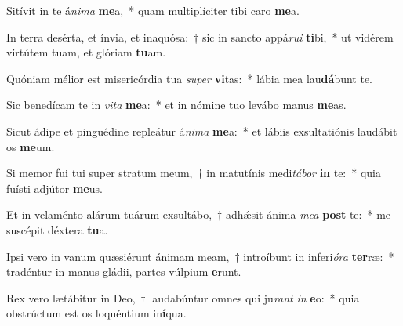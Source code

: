 \item Sitívit in te á\textit{ni}\textit{ma} \textbf{me}a,~* quam multiplíciter tibi caro \textbf{me}a.
\item In terra desérta, et ínvia, et inaquósa:~† sic in sancto appá\textit{ru}\textit{i} \textbf{ti}bi,~* ut vidérem virtútem tuam, et glóriam \textbf{tu}am.
\item Quóniam mélior est misericórdia tua \textit{su}\textit{per} \textbf{vi}tas:~* lábia mea lau\textbf{dá}bunt te.
\item Sic benedícam te in \textit{vi}\textit{ta} \textbf{me}a:~* et in nómine tuo levábo manus \textbf{me}as.
\item Sicut ádipe et pinguédine repleátur á\textit{ni}\textit{ma} \textbf{me}a:~* et lábiis exsultatiónis laudábit os \textbf{me}um.
\item Si memor fui tui super stratum meum,~† in matutínis medi\textit{tá}\textit{bor} \textbf{in} te:~* quia fuísti adjútor \textbf{me}us.
\item Et in velaménto alárum tuárum exsultábo,~† adhǽsit ánima \textit{me}\textit{a} \textbf{post} te:~* me suscépit déxtera \textbf{tu}a.
\item Ipsi vero in vanum quæsiérunt ánimam meam,~† introíbunt in inferi\textit{ó}\textit{ra} \textbf{ter}ræ:~* tradéntur in manus gládii, partes vúlpium \textbf{e}runt.
\item Rex vero lætábitur in Deo,~† laudabúntur omnes qui ju\textit{rant} \textit{in} \textbf{e}o:~* quia obstrúctum est os loquéntium in\textbf{í}qua.
